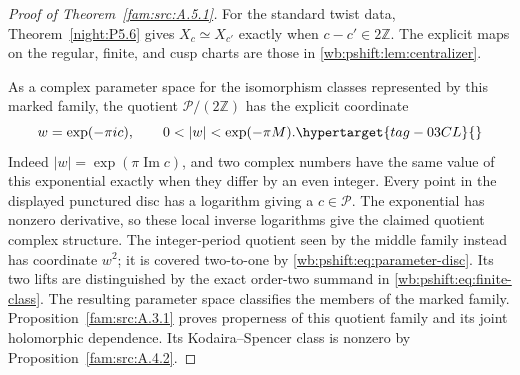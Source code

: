 \hypertarget{tag-000C}{}\label{app:rederive:fam-src-A.5.1}
\begin{proof}[Proof of Theorem~\ref{fam:src:A.5.1}]
For the standard twist data, Theorem~\ref{night:P5.6}
gives $X_c\simeq X_{c'}$ exactly when $c-c'\in2\mathbb Z$.
The explicit maps on the regular, finite, and cusp charts are
those in \cref{wb:pshift:lem:centralizer}.

As a complex parameter space for the isomorphism classes represented
by this marked family, the quotient $\mathcal P/(2\mathbb Z)$ has
the explicit coordinate
\begin{equation}
 w=\exp(-\pi ic),\qquad 0<|w|<\exp(-\pi M).
 \hypertarget{tag-03CL}{}\label{wb:pshift:eq:parameter-disc}
\end{equation}
Indeed $|w|=\exp(\pi\operatorname{Im}c)$, and two complex numbers
have the same value of this exponential exactly when they differ
by an even integer. Every point in the displayed punctured disc
has a logarithm giving a $c\in\mathcal P$. The exponential has
nonzero derivative, so these local inverse logarithms give the
claimed quotient complex structure. The integer-period quotient
seen by the middle family instead has coordinate $w^2$; it is
covered two-to-one by \eqref{wb:pshift:eq:parameter-disc}. Its two lifts are distinguished by
the exact order-two summand in \eqref{wb:pshift:eq:finite-class}. The resulting parameter space classifies the members of the marked family.
Proposition~\ref{fam:src:A.3.1} proves properness of this quotient
family and its joint holomorphic dependence. Its Kodaira--Spencer
class is nonzero by Proposition~\ref{fam:src:A.4.2}.
\end{proof}

